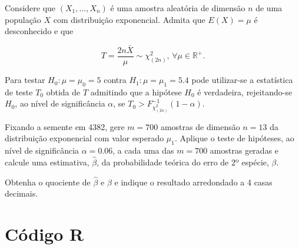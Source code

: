 \documentclass[11pt,a4paper]{article}
\begin{document}
\begin{tcolorbox}[colback=blue!5!white,colframe=blue!75!black,title=Teste de Hipóteses - Erro Tipo II - Exercício 9]

Considere que $(X_1, \ldots, X_n)$ é uma amostra aleatória de dimensão $n$ de uma população $X$ com distribuição exponencial. Admita que $E(X) = \mu$ é desconhecido e que

\[
T = \frac{2n \bar{X}}{\mu} \sim \chi^2_{(2n)}, \, \forall \mu \in \mathbb{R}^+.
\]

Para testar $H_0 : \mu = \mu_0 = 5$ contra $H_1 : \mu = \mu_1 = 5.4$ pode utilizar-se a estatística de teste $T_0$ obtida de $T$ admitindo que a hipótese $H_0$ é verdadeira, rejeitando-se $H_0$, ao nível de significância $\alpha$, se $T_0 > F^{-1}_{\chi^2_{(2n)}}(1 - \alpha)$.

Fixando a semente em 4382, gere $m = 700$ amostras de dimensão $n = 13$ da distribuição exponencial com valor esperado $\mu_1$. Aplique o teste de hipóteses, ao nível de significância $\alpha = 0.06$, a cada uma das $m = 700$ amostras geradas e calcule uma estimativa, $\hat{\beta}$, da probabilidade teórica do erro de $2º$ espécie, $\beta$.

Obtenha o quociente de $\hat{\beta}$ e $\beta$ e indique o resultado arredondado a 4 casas decimais.

\end{tcolorbox}

\section*{Código R}
\end{document}

